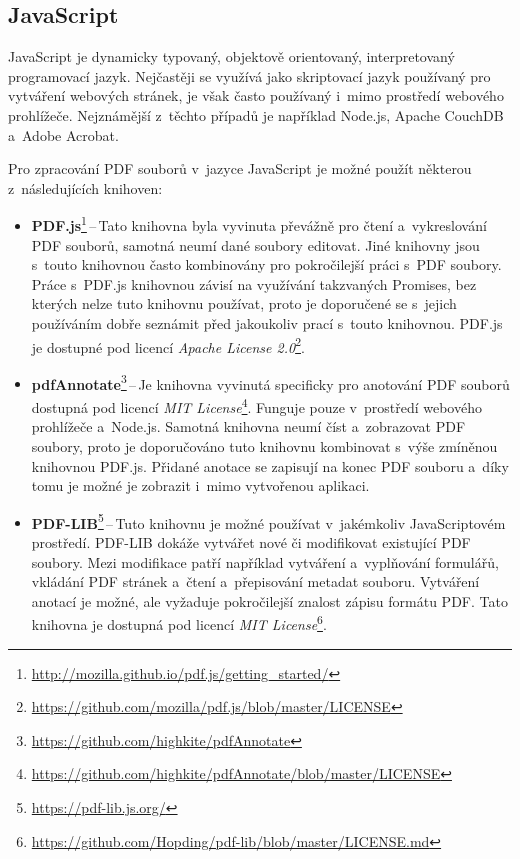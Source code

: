 \dummyText


\subsection*{JavaScript}

JavaScript je dynamicky typovaný, objektově orientovaný, interpretovaný
programovací jazyk. Nejčastěji se využívá jako skriptovací jazyk používaný
pro vytváření webových stránek, je však často používaný i~mimo prostředí webového
prohlížeče. Nejznámější z~těchto případů je například Node.js, Apache CouchDB
a~Adobe Acrobat. 
\cite{JavaScript}

Pro zpracování PDF souborů v~jazyce JavaScript je možné použít některou
z~následujících knihoven:
\begin{itemize}
    \item \textbf{PDF.js}\footnote{
    \href{http://mozilla.github.io/pdf.js/getting_started/}{http://mozilla.github.io/pdf.js/getting\_started/}
    }\,--\,Tato knihovna byla vyvinuta převážně pro čtení a~vykreslování PDF
    souborů, samotná neumí dané soubory editovat. Jiné knihovny jsou s~touto
    knihovnou často kombinovány pro pokročilejší práci s~PDF soubory. Práce
    s~PDF.js knihovnou závisí na využívání takzvaných Promises, bez kterých nelze
    tuto knihovnu používat, proto je doporučené se s~jejich používáním dobře
    seznámit před jakoukoliv prací s~touto knihovnou. PDF.js je dostupné pod
    licencí \emph{Apache License 2.0}\footnote{
    \href{https://github.com/mozilla/pdf.js/blob/master/LICENSE}{https://github.com/mozilla/pdf.js/blob/master/LICENSE}}.
    
    \item \textbf{pdfAnnotate}\footnote{
    \href{https://github.com/highkite/pdfAnnotate}{https://github.com/highkite/pdfAnnotate}
    }\,--\,Je knihovna vyvinutá specificky pro anotování PDF souborů dostupná pod
    licencí \emph{MIT License}\footnote{
    \href{https://github.com/highkite/pdfAnnotate/blob/master/LICENSE}{https://github.com/highkite/pdfAnnotate/blob/master/LICENSE}
    }. Funguje pouze v~prostředí webového prohlížeče a~Node.js. Samotná knihovna
    neumí číst a~zobrazovat PDF soubory, proto je doporučováno tuto knihovnu
    kombinovat s~výše zmíněnou knihovnou PDF.js. Přidané anotace se zapisují
    na konec PDF souboru a~díky tomu je možné je zobrazit i~mimo vytvořenou
    aplikaci.
    
    \item \textbf{PDF-LIB}\footnote{
    \href{https://pdf-lib.js.org/}{https://pdf-lib.js.org/}
    }\,--\,Tuto knihovnu je možné používat v~jakémkoliv JavaScriptovém prostředí.
    PDF-LIB dokáže vytvářet nové či modifikovat existující PDF soubory. Mezi
    modifikace patří například vytváření a~vyplňování formulářů, vkládání PDF
    stránek a~čtení a~přepisování metadat souboru. Vytváření anotací je možné, ale
    vyžaduje pokročilejší znalost zápisu formátu PDF. Tato knihovna je dostupná
    pod licencí \emph{MIT License}\footnote{
    \href{https://github.com/Hopding/pdf-lib/blob/master/LICENSE.md}{https://github.com/Hopding/pdf-lib/blob/master/LICENSE.md}
    }.
\end{itemize}


